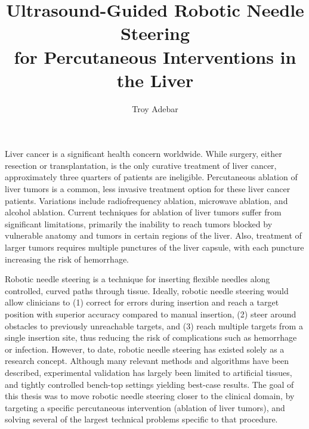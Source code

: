 \documentclass[12pt,twoside]{report}
\begin{document}
\renewcommand{\thepage}{\roman{page}}%

\title{Ultrasound-Guided Robotic Needle Steering\\
            for Percutaneous Interventions in the Liver}
\author{Troy Adebar}
 
\beforepreface
Liver cancer is a significant health concern worldwide. While surgery, either resection or transplantation, is the only curative treatment of liver cancer, approximately three quarters of patients are ineligible. Percutaneous ablation of liver tumors is a common, less invasive treatment option for these liver cancer patients. Variations include radiofrequency ablation, microwave ablation, and alcohol ablation. Current techniques for ablation of liver tumors suffer from significant limitations, primarily the inability to reach tumors blocked by vulnerable anatomy and tumors in certain regions of the liver. Also, treatment of larger tumors requires multiple punctures of the liver capsule, with each puncture increasing the risk of hemorrhage.

Robotic needle steering is a technique for inserting flexible needles along controlled, curved paths through tissue. Ideally, robotic needle steering would allow clinicians to (1) correct for errors during insertion and reach a target position with superior accuracy compared to manual insertion, (2) steer around obstacles to previously unreachable targets, and (3) reach multiple targets from a single insertion site, thus reducing the risk of complications such as hemorrhage or infection. However, to date, robotic needle steering has existed solely as a research concept. Although many relevant methods and algorithms have been described, experimental validation has largely been limited to artificial tissues, and tightly controlled bench-top settings yielding best-case results. The goal of this thesis was to move robotic needle steering closer to the clinical domain, by targeting a specific percutaneous intervention (ablation of liver tumors), and solving several of the largest technical problems specific to that procedure.
\end{document}
